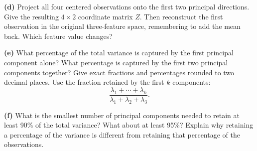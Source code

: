 \documentclass[12pt,letterpaper]{article}
\begin{document}
\textbf{(d)} Project all four centered observations onto the first two
principal directions. Give the resulting $4\times2$ coordinate matrix $Z$.
Then reconstruct the first observation in the original three-feature space,
remembering to add the mean back. Which feature value changes?
\vspace{1.6in}

\newpage
\textbf{(e)} What percentage of the total variance is captured by the first
principal component alone? What percentage is captured by the first two
principal components together? Give exact fractions and percentages rounded
to two decimal places. Use the fraction retained by the first $k$ components:
\[
\frac{\lambda_1+\cdots+\lambda_k}{\lambda_1+\lambda_2+\lambda_3}.
\]
\vspace{2.35in}

\textbf{(f)} What is the smallest number of principal components needed to
retain at least 90\% of the total variance? What about at least 95\%?
Explain why retaining a percentage of the variance is different from
retaining that percentage of the observations.
\end{document}
